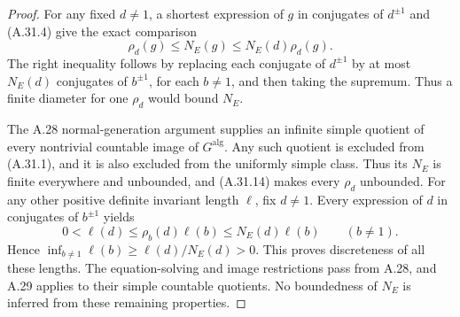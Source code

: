 \begin{proof}
For any fixed $d\ne1$, a shortest expression of $g$ in
conjugates of $d^{\pm1}$ and (A.31.4) give the exact comparison
\[
 \rho_d(g)\leq N_E(g)\leq N_E(d)\rho_d(g).
 \tag{A.31.14}
\]
The right inequality follows by replacing each conjugate
of $d^{\pm1}$ by at most $N_E(d)$ conjugates of
$b^{\pm1}$, for each $b\ne1$, and then taking the
supremum. Thus a finite diameter for one $\rho_d$
would bound $N_E$.

The A.28 normal-generation argument supplies an infinite
simple quotient of every nontrivial countable image of
$G^{\mathrm{alg}}$. Any such quotient is excluded from
(A.31.1), and it is also excluded from the uniformly
simple class. Thus its $N_E$ is finite everywhere and
unbounded, and (A.31.14) makes every $\rho_d$ unbounded.
For any other positive definite invariant
length $\ell$, fix $d\ne1$. Every expression of $d$ in
conjugates of $b^{\pm1}$ yields
\[
 0<\ell(d)\leq\rho_b(d)\ell(b)
       \leq N_E(d)\ell(b)\qquad(b\ne1).
 \tag{A.31.15}
\]
Hence $\inf_{b\ne1}\ell(b)\geq\ell(d)/N_E(d)>0$.
This proves discreteness of all these lengths. The
equation-solving and image restrictions pass from A.28,
and A.29 applies to their simple countable quotients.
No boundedness of $N_E$ is inferred from these remaining
properties.
\end{proof}
